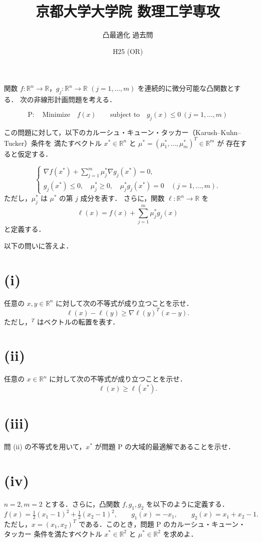 \documentclass[12pt,a4paper]{article}
\title{京都大学大学院 数理工学専攻}
\author{凸最適化 過去問}
\date{H25 (OR)}
\begin{document}
\maketitle

関数 $f:\mathbb{R}^n \to \mathbb{R}$，$g_j:\mathbb{R}^n \to \mathbb{R}$ $(j=1,\dots,m)$ を連続的に微分可能な凸関数とする．
次の非線形計画問題を考える．

\[
\text{P}: \quad \text{Minimize}\quad f(x) \qquad \text{subject to}\quad g_j(x) \le 0 \ (j=1,\dots,m)
\]

この問題に対して，以下のカルーシュ・キューン・タッカー（Karush--Kuhn--Tucker）条件を
満たすベクトル $x^*\in\mathbb{R}^n$ と $\mu^*=(\mu_1^*,\dots,\mu_m^*)^T\in\mathbb{R}^m$ が
存在すると仮定する．

\[
\begin{cases}
\nabla f(x^*) + \sum_{j=1}^m \mu_j^* \nabla g_j(x^*) = 0, \\
 g_j(x^*) \le 0, \quad \mu_j^* \ge 0, \quad \mu_j^* g_j(x^*) = 0 \quad (j=1,\dots,m).
\end{cases}
\]
ただし，$\mu_j^*$ は $\mu^*$ の第 $j$ 成分を表す．
さらに，関数 $\ell:\mathbb{R}^n \to \mathbb{R}$ を
\[
\ell(x) = f(x) + \sum_{j=1}^m \mu_j^* g_j(x)
\]
と定義する．

以下の問いに答えよ．

\section*{(i)}
任意の $x,y\in\mathbb{R}^n$ に対して次の不等式が成り立つことを示せ．
\[
\ell(x) - \ell(y) \ge \nabla\ell(y)^T(x-y).
\]
ただし，$^T$ はベクトルの転置を表す．

\section*{(ii)}
任意の $x\in\mathbb{R}^n$ に対して次の不等式が成り立つことを示せ．
\[
\ell(x) \ge \ell(x^*).
\]

\section*{(iii)}
問 (ii) の不等式を用いて，$x^*$ が問題 P の大域的最適解であることを示せ．

\section*{(iv)}
$n=2, m=2$ とする．さらに，凸関数 $f,g_1,g_2$ を以下のように定義する．
\[
 f(x)=\tfrac12 (x_1-1)^2 + \tfrac12 (x_2-1)^2, \qquad g_1(x)=-x_1, \qquad g_2(x)=x_1+x_2-1.
\]
ただし，$x=(x_1,x_2)^T$ である．このとき，問題 P のカルーシュ・キューン・タッカー
条件を満たすベクトル $x^*\in\mathbb{R}^2$ と $\mu^*\in\mathbb{R}^2$ を求めよ．
\end{document}
